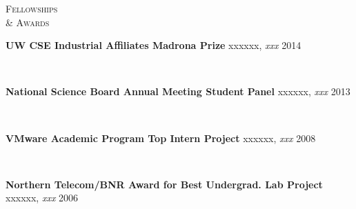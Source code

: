 \documentclass[10pt,minionpro]{report}
\newlength{\sectiongap}
\newlength{\entrygap}
\newlength{\sectioncolwidth}
\newlength{\colgap}
\newlength{\stuffwidth}
\def\ifEqString#1#2{\def\testa{#1}\def\testb{#2}%
  \ifx\testa\testb}
\newenvironment{rtable}{
  \begin{minipage}{\textwidth}
  }{
  \end{minipage}
}
\newenvironment{rentry}[3][xxx]{
  \begin{minipage}[t]{\hsize}
    \textbf{#2}\ifEqString{#1}{xxx}\relax\else, \textit{#1}\fi
    \hspace{\stretch{1}} #3 \\
  }{
    \removelastskip
  \end{minipage}
  \\[\entrygap]  %
}
\newenvironment{rsection}[1]{
  \begin{minipage}[t]{\sectioncolwidth}
    \textsc{#1}
  \end{minipage}
  \hspace{\colgap}
  \begin{minipage}[t]{\stuffwidth}
  }{
    \removelastskip
  \end{minipage}
  \\[\sectiongap]
}
\begin{document}
\begin{rtable}
\begin{rsection}{Fellowships\\\& Awards}
    \begin{rentry}{UW CSE Industrial Affiliates Madrona Prize}{2014}
       \vspace{-0.75em}
    \end{rentry}
    \begin{rentry}{National Science Board Annual Meeting Student
        Panel}{2013}
      \vspace{-0.75em}
    \end{rentry}
    \begin{rentry}{VMware Academic Program Top Intern Project}{2008}
       \vspace{-0.75em}
    \end{rentry}
    \begin{rentry}{Northern Telecom/BNR Award for Best Undergrad. Lab
        Project}{2006}
      \vspace{-0.75em}
    \end{rentry}
  \end{rsection}


\end{rtable}
\end{document}
